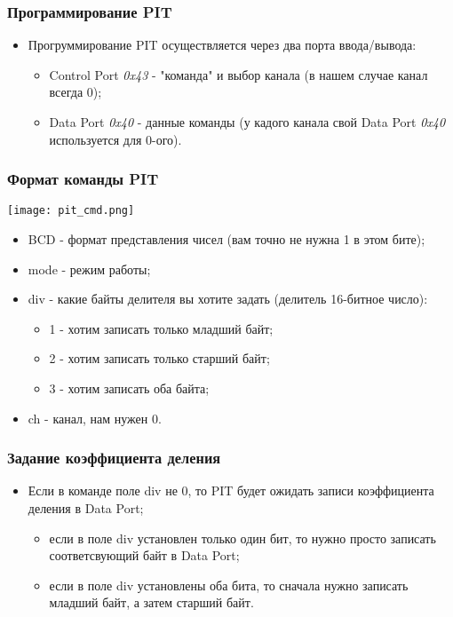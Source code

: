 \begin{frame}
\frametitle{Программирование PIT}
\begin{itemize}
  \item Прогруммирование PIT осуществляется через два порта ввода/вывода:
  \begin{itemize}
    \item Control Port \emph{0x43} - "команда" и выбор канала (в нашем случае
    канал всегда 0);
    \item Data Port \emph{0x40} - данные команды (у кадого канала свой Data Port
    \emph{0x40} используется для 0-ого).
  \end{itemize}
\end{itemize}
\end{frame}

\begin{frame}
\frametitle{Формат команды PIT}
\begin{center}
  \texttt{[image: pit\_cmd.png]}
\end{center}
\begin{itemize}
  \item BCD - формат представления чисел (вам точно не нужна 1 в этом бите);
  \item mode - режим работы;
  \item div - какие байты делителя вы хотите задать (делитель 16-битное число):
  \begin{itemize}
    \item 1 - хотим записать только младший байт;
    \item 2 - хотим записать только старший байт;
    \item 3 - хотим записать оба байта;
  \end{itemize}
  \item ch - канал, нам нужен 0.
\end{itemize}
\end{frame}

\begin{frame}
\frametitle{Задание коэффициента деления}
\begin{itemize}
  \item Если в команде поле div не 0, то PIT будет ожидать записи коэффициента
  деления в Data Port;
  \begin{itemize}
    \item если в поле div установлен только один бит, то нужно просто записать
    соответсвующий байт в Data Port;
    \item если в поле div установлены оба бита, то сначала нужно записать
    младший байт, а затем старший байт.
  \end{itemize}
\end{itemize}
\end{frame}
